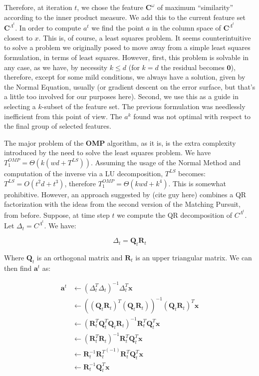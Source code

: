 \documentclass[12pt,a4paper,oneside,english]{UPBThesis}
\begin{document}
Therefore, at iteration $t$, we chose the feature $\textbf{C}^\omega$ of maximum ``similarity'' according to the inner product measure. We add this to the current feature set $\textbf{C}^{\Lambda^t}$. In order to compute $a^t$ we find the point $a$ in the column space of $\textbf{C}^{\Lambda^t}$ closest to $x$. This is, of course, a least squares problem. It seems counterintuitive to solve a problem we originally posed to move away from a simple least squares formulation, in terms of least squares. However, first, this problem is solvable in any case, as we have, by necessity $k \leq d$ (for $k = d$ the residual becomes $\textbf{0}$), therefore, except for some mild conditions, we always have a solution, given by the Normal Equation, usually (or gradient descent on the error surface, but that's a little too involved for our purposes here). Second, we use this as a guide in selecting a $k$-subset of the feature set. The previous formulation was needlessly inefficient from this point of view. The $a^k$ found was not optimal with respect to the final group of selected features.

The major problem of the \textbf{OMP} algorithm, as it is, is the extra complexity introduced by the need to solve the least squares problem. We have $T_1^{OMP} = \Theta(k(wd + T^{LS}))$. Assuming the usage of the Normal Method and computation of the inverse via a LU decomposition, $T^{LS}$ becomes: $T^{LS} = O(t^2d + t^3)$, therefore $T_1^{OMP} = \Theta(kwd + k^4)$. This is somewhat prohibitive. However, an approach suggested by (cite guy here) combines a QR factorization with the ideas from the second version of the Matching Pursuit, from before. Suppose, at time step $t$ we compute the QR decomposition of $C^{\Lambda^t}$. Let $\Delta_t = C^{\Lambda^t}$. We have:

\begin{equation}
\Delta_t = \textbf{Q}_t\textbf{R}_t
\end{equation}

Where $\textbf{Q}_t$ is an orthogonal matrix and $\textbf{R}_t$ is an upper triangular matrix. We can then find $\textbf{a}^t$ as:

\begin{align*}
\textbf{a}^t & \gets (\Delta_t^T\Delta_t)^{-1}\Delta_t^T\textbf{x} \\
             & \gets ((\textbf{Q}_t\textbf{R}_t)^T(\textbf{Q}_t\textbf{R}_t))^{-1}(\textbf{Q}_t\textbf{R}_t)^T\textbf{x} \\
             & \gets (\textbf{R}_t^T\textbf{Q}_t^T\textbf{Q}_t\textbf{R}_t)^{-1}\textbf{R}_t^T\textbf{Q}_t^T\textbf{x} \\
             & \gets (\textbf{R}_t^T\textbf{R}_t)^{-1}\textbf{R}_t^T\textbf{Q}_t^T\textbf{x} \\
             & \gets \textbf{R}_t^{-1}{\textbf{R}_t^T}^{(-1)}\textbf{R}_t^T\textbf{Q}_t^T\textbf{x} \\
             & \gets \textbf{R}_t^{-1}\textbf{Q}_t^T\textbf{x}
\end{align*}
\end{document}
